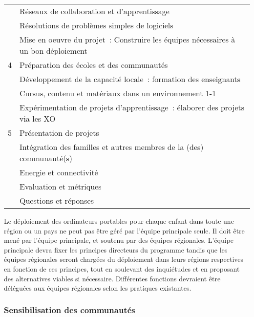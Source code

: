 \documentclass[11pt]{article}
\begin{document}
\begin{table}[htb]
\begin{center}
\begin{tabular}{|l|l|}
       &  Réseaux de collaboration et d’apprentissage                                         \\
       &  Résolutions de problèmes simples de logiciels                                       \\
\hline
       &  Mise en oeuvre du projet : Construire les équipes nécessaires à un bon déploiement  \\
    4  &  Préparation des écoles et des communautés                                           \\
       &  Développement de la capacité locale : formation des enseignants                     \\
       &  Cursus, contenu et matériaux dans un environnement 1-1                              \\
       &  Expérimentation de projets d’apprentissage : élaborer des projets via les XO        \\
\hline
    5  &  Présentation de projets                                                             \\
       &  Intégration des familles et autres membres de la (des) communauté(s)                \\
       &  Energie et connectivité                                                             \\
       &  Evaluation et métriques                                                             \\
       &  Questions et réponses                                                               \\
\hline
\end{tabular}
\end{center}
\end{table}


Le déploiement des ordinateurs portables pour chaque enfant dans toute une
région ou un pays ne peut pas être géré par l'équipe principale seule. Il
doit être mené par l'équipe principale, et soutenu par des équipes
régionales. L'équipe principale devra fixer les principes directeurs du
programme tandis que les équipes régionales seront chargées du déploiement
dans leurs régions respectives en fonction de ces principes, tout en
soulevant des inquiétudes et en proposant des alternatives viables si
nécessaire. Différentes fonctions devraient être déléguées aux équipes
régionales selon les pratiques existantes.
\subsubsection{Sensibilisation des communautés}
\label{sec-9-3-2}
\end{document}
